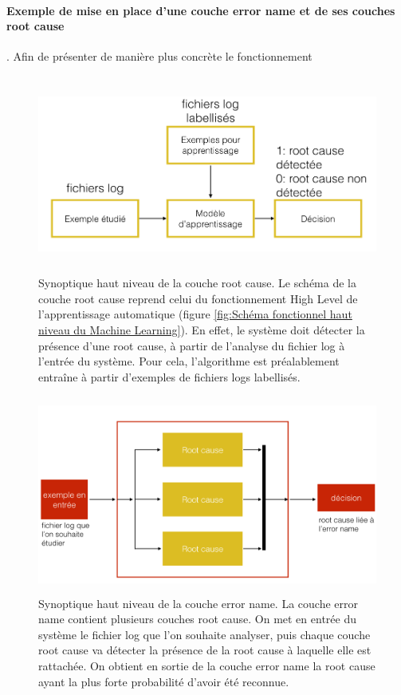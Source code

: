 \paragraph{Exemple de mise en place  d'une couche error name et de ses couches root cause}.
Afin de présenter de manière plus concrète le fonctionnement  
\begin{figure}[h]
	\centering\includegraphics[height=6.5cm]{images/synoptique_root.png}
	\caption[Synoptique haut niveau de la couche root cause]{Synoptique haut niveau de la couche root cause. Le schéma de la couche root cause reprend celui du fonctionnement High Level de l'apprentissage automatique (figure \ref{fig:Schéma fonctionnel haut niveau du Machine Learning}). En effet, le système doit détecter la présence d'une root cause, à partir de l'analyse du fichier log à l'entrée du système. Pour cela, l'algorithme est préalablement entraîne à partir d'exemples de fichiers logs labellisés.}
	\label{fig:synoptique haut niveau de la solution proposée: couche root cause}
\end{figure}

\begin{figure}[h]
	\centering\includegraphics[height=6.5cm]{images/synoptique_error.png}
	\caption[Synoptique haut niveau de la couche error name]{Synoptique haut niveau de la couche error name. La couche error name contient plusieurs couches root cause. On met en entrée du système le fichier log que l'on souhaite analyser, puis chaque couche root cause va détecter la présence de la root cause à laquelle elle est rattachée. On obtient en sortie de la couche error name la root cause  ayant la plus forte probabilité d'avoir été reconnue.}
	\label{fig:synoptique haut niveau de la solution proposée: couche error name}
\end{figure}

